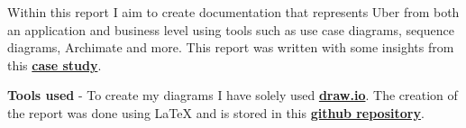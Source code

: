 \documentclass{article}
\begin{document}
    Within this report I aim to create documentation that represents Uber from both an application and business level using tools such as 
    use case diagrams, sequence diagrams, Archimate and more. This report was written with some insights from this \href{https://learn-eu-central-1-prod-fleet01-xythos.content.blackboardcdn.com/5d2cb9c32e9d7/4991549?X-Blackboard-Expiration=1653922800000&X-Blackboard-Signature=a2RnywjBpwblbDHmnp%2BXEpXu5N%2FFoCmkQs%2FBPlAAUAo%3D&X-Blackboard-Client-Id=163100&response-cache-control=private%2C%20max-age%3D21600&response-content-disposition=inline%3B%20filename%2A%3DUTF-8%27%27Reading1-Uber-CaseStudy%2520%25281%2529.hai.pdf&response-content-type=application%2Fpdf&X-Amz-Security-Token=IQoJb3JpZ2luX2VjEBgaDGV1LWNlbnRyYWwtMSJGMEQCIHIn%2BZn3gy3MjoPp7PH8o8SnEhgHocgjO0CPywLkcPIXAiAIwi1oSntPYzMUdrA%2FGVOy4wq4jKDGcCVfnD7ffXaIkSrcBAgREAIaDDYzNTU2NzkyNDE4MyIMbRXWMdMQ5uaeyu%2BXKrkEseD2PJmHV%2Fj1ElO5YaeFrgTrUJewyFaGJTLDptki%2Fw6Q%2Bfwo0H6dymEdL4rI6suCDdx2RwJxWKHNCDeFPFh15O0H6KG3qCcX%2FovlcsZ%2Bh499B6hJiMWnFXvUnuWaPcx%2BV6e01ECkcMfeo7brbj8ESEg6SQIJ1nX5BXlg7UtRDLXTosDkKcWx7v1BCND32q1UkRbr%2Bs5J4iZpddBWaxLUsea0LF%2BjlQiS8%2FXREUTvbtgPmNRLSuQAbM7KWHTnEZvsbWOvwSG8nkcbQE8yTiQFrpoRUuWYt33NAVg6HXxNAwqTHGcVA8nbiPt2bN%2FLjEt344CUJYG0gA35UCtYf3DR0PrCzbrV2pEVioy0%2FX9Kvvbv2h1WYHvGD1Q%2BvrXMhizyd2InWYiU1X4EeMC7Im1rHbYt0qo3RXKqZlzNxM%2F0zaNe0IRkbsGQJarkF5DP3bz7NeU188afhSfu7T6xYhAajAVrnGxhooCc3YI66br60NygfY2OAp2MeKI6dzNw0FdfsaA31f%2BZasU9n2aP3weV7AwZvaGMpGoXahuvjnJ9mKuWKc6HrWu8HPJhq7Wr3mOC9bd8YBDG2WzIrB9kM45iNQOTG67CMF5x7eXj4KNVntZgG63Jn%2BBxiVLgIxMR55%2BsA0IkQ9DXQoj0esQ2J3JBystYLTp79c5N5hB4iUr1w4i%2Fm20B1XVarZjUTObKPU%2FOhVMd2J0L3G3zBNVRH0el8n8UoO1L8s8M%2BITAhjLhoOO7%2BLkRlFfNmSUwpPvRlAY6qgH6gVLQCu8%2B4x1Gr4OZSSDIGJg8JceJGTGUuQTC4zObK%2FZFQf%2BCrgd5Yq9gmyB%2BAOERsBIpT6ovUVoNUY5CAx%2FHixZ6KneGKse3MAew4DX1G%2BVgC9yLWmgKAHtv0GZxfXyNshE3L9BSYbygxLiRZTj%2BEnF1Sb5WuM%2FANwhzfr%2Fv7xbJO8gk6ThTqegZJ%2FVz13WjTdieKNSwy4yyux01cLEanOenPhlqjOhSpg%3D%3D&X-Amz-Algorithm=AWS4-HMAC-SHA256&X-Amz-Date=20220530T090000Z&X-Amz-SignedHeaders=host&X-Amz-Expires=21600&X-Amz-Credential=ASIAZH6WM4PL5GS33QWA%2F20220530%2Feu-central-1%2Fs3%2Faws4_request&X-Amz-Signature=3bdd17adaf97b1927bdb8b06a7be5ddc78ca982d1660562cfa92729d6cdc622f}{\textbf{case study}}.

    \textbf{Tools used} - To create my diagrams I have solely used \href{draw.io}{\textbf{draw.io}}. The creation of the report was done using LaTeX and is stored in 
    this \href{https://github.com/OMBowkerBBC/DC4100-Assignment-1}{\textbf{github repository}}.
    \newpage
  
\end{document}
